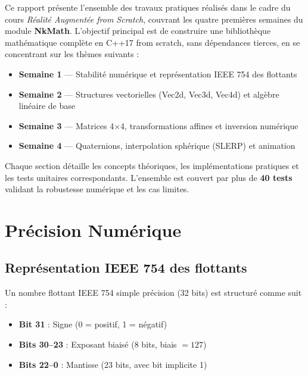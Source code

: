 \documentclass[11pt,a4paper]{article}
\begin{document}
Ce rapport présente l'ensemble des travaux pratiques réalisés dans le cadre du cours \textit{Réalité Augmentée from Scratch}, couvrant les quatre premières semaines du module \textbf{NkMath}. L'objectif principal est de construire une bibliothèque mathématique complète en C++17 from scratch, sans dépendances tierces, en se concentrant sur les thèmes suivants :

\begin{itemize}[leftmargin=2em, itemsep=4pt]
    \item \textbf{Semaine 1} — Stabilité numérique et représentation IEEE 754 des flottants
    \item \textbf{Semaine 2} — Structures vectorielles (Vec2d, Vec3d, Vec4d) et algèbre linéaire de base
    \item \textbf{Semaine 3} — Matrices 4$\times$4, transformations affines et inversion numérique
    \item \textbf{Semaine 4} — Quaternions, interpolation sphérique (SLERP) et animation
\end{itemize}

Chaque section détaille les concepts théoriques, les implémentations pratiques et les tests unitaires correspondants. L'ensemble est couvert par plus de \textbf{40 tests} validant la robustesse numérique et les cas limites.

\newpage

\section{Précision Numérique}

\subsection{Représentation IEEE 754 des flottants}

Un nombre flottant IEEE 754 simple précision (32 bits) est structuré comme suit :

\begin{itemize}[itemsep=2pt]
    \item \textbf{Bit 31} : Signe (0 = positif, 1 = négatif)
    \item \textbf{Bits 30–23} : Exposant biaisé (8 bits, biais $= 127$)
    \item \textbf{Bits 22–0} : Mantisse (23 bits, avec bit implicite 1)
\end{itemize}
\end{document}
